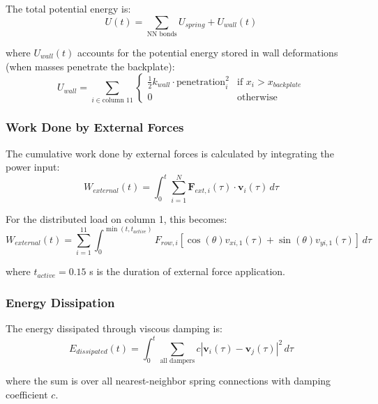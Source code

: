 \documentclass[11pt,a4paper]{article}
\begin{document}
\noindent The total potential energy is:
\begin{equation}
U(t) = \sum_{\text{NN bonds}} U_{spring} + U_{wall}(t)
\label{eq:potential_energy}
\end{equation}

\noindent where $U_{wall}(t)$ accounts for the potential energy stored in wall deformations (when masses penetrate the backplate):
\begin{equation}
U_{wall} = \sum_{i \in \text{column 11}} \begin{cases}
\frac{1}{2} k_{wall} \cdot \text{penetration}_i^2 & \text{if } x_i > x_{backplate} \\
0 & \text{otherwise}
\end{cases}
\end{equation}

\subsubsection{Work Done by External Forces}

\noindent The cumulative work done by external forces is calculated by integrating the power input:
\begin{equation}
W_{external}(t) = \int_0^t \sum_{i=1}^{N} \mathbf{F}_{ext,i}(\tau) \cdot \mathbf{v}_i(\tau) \, d\tau
\label{eq:work_calculation}
\end{equation}

\noindent For the distributed load on column 1, this becomes:
\begin{equation}
W_{external}(t) = \sum_{i=1}^{11} \int_0^{\min(t, t_{active})} F_{row,i} [\cos(\theta) v_{xi,1}(\tau) + \sin(\theta) v_{yi,1}(\tau)] \, d\tau
\end{equation}

\noindent where $t_{active} = 0.15$ s is the duration of external force application.

\subsubsection{Energy Dissipation}

\noindent The energy dissipated through viscous damping is:
\begin{equation}
E_{dissipated}(t) = \int_0^t \sum_{\text{all dampers}} c |\mathbf{v}_i(\tau) - \mathbf{v}_j(\tau)|^2 \, d\tau
\label{eq:energy_dissipation}
\end{equation}

\noindent where the sum is over all nearest-neighbor spring connections with damping coefficient $c$.
\end{document}
